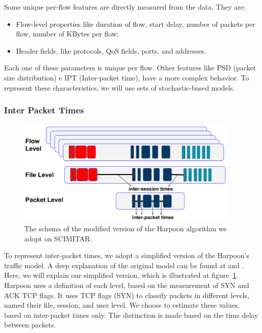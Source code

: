 Some unique per-flow features are directly measured from the data. They are:  

\begin{itemize}
\item Flow-level properties like duration of flow, start delay, number of packets per flow, number of KBytes per flow; 
\item Header fields, like protocols, QoS fields, ports, and addresses.
\end{itemize}

Each one of these parameters is unique per flow. Other features like PSD (packet size distribution) e IPT (Inter-packet time), have a more complex behavior.  To represent these characteristics, we will use sets of stochastic-based models.  


\subsubsection{Inter Packet Times}

\begin{figure}[ht!]
    \centering
    \includegraphics[height=2.0in]{figures/ch3/modified-harpoon-model}
    \caption{The schema of the modified version of the Harpoon algorithm we adopt on SCIMITAR.}
    \label{fig:modified-harpoon-model}
\end{figure}


To represent inter-packet times, we adopt a simplified version of the Harpoon's traffic model. A deep explanation of the original model can be found at \cite{harpoon-paper} and \cite{harpoon-validation}. Here, we will explain our simplified version, which is illustrated at figure~\ref{fig:modified-harpoon-model}. Harpoon uses a definition of each level, based on the measurement of SYN and ACK TCP flags. It uses TCP flags (SYN) to classify packets in different levels, named their file, session, and user level. We choose to estimate these values, based on inter-packet times only. The distinction is made based on the time delay between packets.


